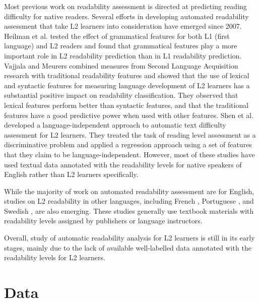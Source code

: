 \documentclass[11pt,letterpaper]{article}
\begin{document}
		Most previous work on readability assessment is directed at predicting reading difficulty for native readers. Several efforts in developing automated readability assessment that take L2 learners into consideration have emerged since 2007. Heilman et al.  tested the effect of grammatical features for both L1 (first language) and L2 readers and found that grammatical features play a more important role in L2 readability prediction than in L1 readability prediction. Vajjala and Meurers  combined measures from Second Language Acquisition research with traditional readability features and showed that the use of lexical and syntactic features for measuring language development of L2 learners has a substantial positive impact on readability classification. They observed that lexical features perform better than syntactic features, and that the traditional features have a good predictive power when used with other features. Shen et al.  developed a language-independent approach to automatic text difficulty assessment for L2 learners. They treated the task of reading level assessment as a discriminative problem and applied a regression approach using a set of features that they claim to be language-independent. However, most of these studies have used textual data annotated with the readability levels for native speakers of English rather than L2 learners specifically.
		
		While the majority of work on automated readability assessment are for English, studies on L2 readability in other languages, including French \cite{franccois2012ai}, Portuguese \cite{branco2014assessing}, and Swedish \cite{volodina2015}, are also emerging. These studies generally use textbook materials with readability levels assigned by publishers or language instructors.
		
		Overall, study of automatic readability analysis for L2 learners is still in its early stages, mainly due to the lack of available well-labelled data annotated with the readability levels for L2 learners.
		


\section{Data}

    
\end{document}
